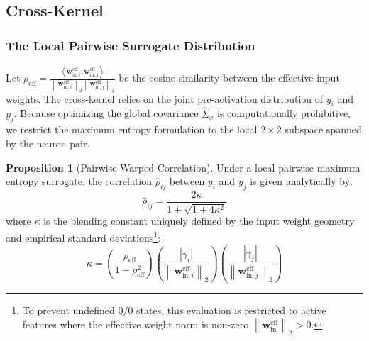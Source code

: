 \documentclass[11pt, a4paper, copyright, gdm]{google}
\newcommand{\norm}[1]{\left\lVert#1\right\rVert}
\newcommand{\inner}[2]{\left\langle#1, #2\right\rangle}
\newcommand{\wVect}{\boldsymbol{w}}
\theoremstyle{definition}
\newtheorem{proposition}[theorem]{Proposition}
\begin{document}
\subsection{Cross-Kernel}
\label{sec:cross-kernel}

\subsubsection{The Local Pairwise Surrogate Distribution}
Let $\rho_{\text{eff}} = \frac{\inner{\wVect_{\text{in},i}^{\text{eff}}}{\wVect_{\text{in},j}^{\text{eff}}}}{\norm{\wVect_{\text{in},i}^{\text{eff}}}_2 \norm{\wVect_{\text{in},j}^{\text{eff}}}_2}$ be the cosine similarity between the effective input weights. The cross-kernel relies on the joint pre-activation distribution of $y_i$ and $y_j$. Because optimizing the global covariance $\hat{\Sigma}_x$ is computationally prohibitive, we restrict the maximum entropy formulation to the local $2 \times 2$ subspace spanned by the neuron pair.

\begin{proposition}[Pairwise Warped Correlation]
\label{prop:warped_corr}
Under a local pairwise maximum entropy surrogate, the correlation $\hat{\rho}_{ij}$ between $y_i$ and $y_j$ is given analytically by:
\begin{equation}
\label{eq:def_hat_rho}
    \hat{\rho}_{ij} = \frac{2\kappa}{1 + \sqrt{1 + 4\kappa^2}}
\end{equation}
where $\kappa$ is the blending constant uniquely defined by the input weight geometry and empirical standard deviations\footnote{To prevent undefined $0/0$ states, this evaluation is restricted to active features where the effective weight norm is non-zero $\norm{\wVect_{\text{in}}^{\text{eff}}}_2 > 0$.}:
\begin{equation}
    \kappa = \left( \frac{\rho_{\text{eff}}}{1 - \rho_{\text{eff}}^2} \right) \left( \frac{|\gamma_i|}{\norm{\wVect_{\text{in},i}^{\text{eff}}}_2} \right) \left( \frac{|\gamma_j|}{\norm{\wVect_{\text{in},j}^{\text{eff}}}_2} \right)
\end{equation}
\end{proposition}
\end{document}
